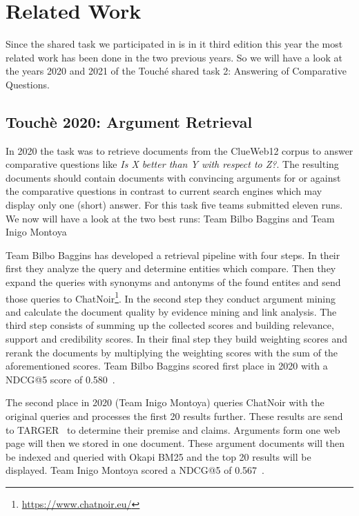 \section{Related Work}
    Since the shared task we participated in is in it third edition this year the most related work has been done in the two previous years. So we will have a look at the years 2020 and 2021 of the Touché shared task 2: Answering of Comparative Questions.
    \subsection{Touchè 2020: Argument Retrieval}
        In 2020 the task was to retrieve documents from the ClueWeb12 corpus to answer comparative questions like \textit{Is X better than Y with respect to Z?}. The resulting documents should contain documents with convincing arguments for or against the comparative questions in contrast to current search engines which may display only one (short) answer. For this task five teams submitted eleven runs. We now will have a look at the two best runs: Team Bilbo Baggins and Team Inigo Montoya~\cite{BondarenkoFBGAPBSWPH2020}\par
        Team Bilbo Baggins has developed a retrieval pipeline with four steps. In their first they analyze the query and determine entities which compare. Then they expand the queries with synonyms and antonyms of the found entites and send those queries to ChatNoir\footnote{\url{https://www.chatnoir.eu/}}. In the second step they conduct argument mining and calculate the document quality by evidence mining and link analysis. The third step consists of summing up the collected scores and building relevance, support and credibility scores. In their final step they build weighting scores and rerank the documents by multiplying the weighting scores with the sum of the aforementioned scores. Team Bilbo Baggins scored first place in 2020 with a NDCG@5 score of 0.580~\cite{AbyeST2020}.\par
        The second place in 2020 (Team Inigo Montoya) queries ChatNoir with the original queries and processes the first 20 results further. These results are send to TARGER~\cite{ChernodubOHBHBP2019} to determine their premise and claims. Arguments form one web page will then we stored in one document. These argument documents will then be indexed and queried with Okapi BM25 and the top 20 results will be displayed. Team Inigo Montoya scored a NDCG@5 of 0.567~\cite{Huck2020}.
